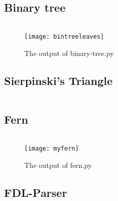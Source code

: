 \documentclass[titlepage]{article}
\begin{document}
\subsection{Binary tree}
\label{app:bintree}
\inputminted{python}{binary-tree.py}
\begin{figure}[H]
  \centering
  \texttt{[image: bintreeleaves]}
  \caption{The output of binary-tree.py}
\end{figure}
\subsection{Sierpinski's Triangle}
\label{app:sierpinski}
\inputminted{python}{sierpinsky-triangle.py}
\subsection{Fern}
\label{app:fern}
\inputminted{python}{fern.py}
\begin{figure}[H]
  \centering
  \texttt{[image: myfern]}
  \caption{The output of fern.py}
\end{figure}
\subsection{FDL-Parser}
\inputminted{python}{fdlParser.py}
\end{document}
